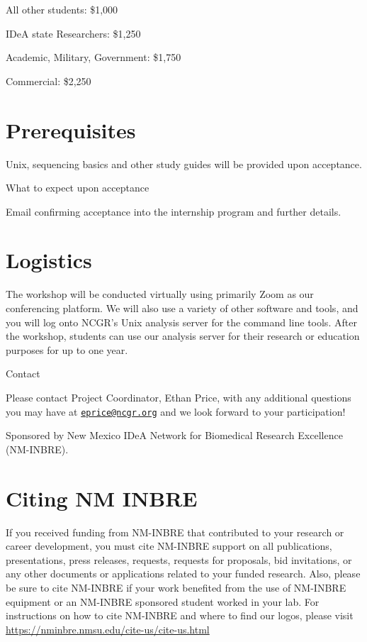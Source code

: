 \documentclass[
]{book}
\begin{document}
All other students:
\$1,000

IDeA state Researchers:
\$1,250

Academic, Military, Government:
\$1,750

Commercial:
\$2,250

\hypertarget{prerequisites-2}{%
\section*{Prerequisites}\label{prerequisites-2}}

Unix, sequencing basics and other study guides will be provided upon acceptance.

What to expect upon acceptance

Email confirming acceptance into the internship program and further details.

\hypertarget{logistics-2}{%
\section*{Logistics}\label{logistics-2}}

The workshop will be conducted virtually using primarily Zoom as our conferencing platform. We will also use a variety of other software and tools, and you will log onto NCGR's Unix analysis server for the command line tools. After the workshop, students can use our analysis server for their research or education purposes for up to one year.

Contact

Please contact Project Coordinator, Ethan Price, with any additional questions you may have at \href{mailto:eprice@ncgr.org}{\nolinkurl{eprice@ncgr.org}} and we look forward to your participation!

Sponsored by New Mexico IDeA Network for Biomedical Research Excellence (NM-INBRE).

\hypertarget{citing-nm-inbre}{%
\section*{Citing NM INBRE}\label{citing-nm-inbre}}

If you received funding from NM-INBRE that contributed to your research or career development, you must cite NM-INBRE support on all publications, presentations, press releases, requests, requests for proposals, bid invitations, or any other documents or applications related to your funded research. Also, please be sure to cite NM-INBRE if your work benefited from the use of NM-INBRE equipment or an NM-INBRE sponsored student worked in your lab.
For instructions on how to cite NM-INBRE and where to find our logos, please visit \url{https://nminbre.nmsu.edu/cite-us/cite-us.html}
\end{document}
